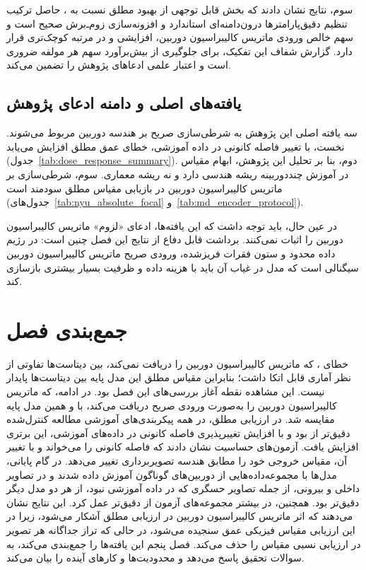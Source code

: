 سوم، نتایج نشان دادند که بخش قابل توجهی از بهبود مطلق
نسبت به \publishedbasemodel{}،
حاصل ترکیب تنظیم دقیق‌پارامترها درون‌دامنه‌ای استاندارد
و افزونه‌سازی زوم‌ـ‌برش صحیح است
و سهم خالص ورودی ماتریس کالیبراسیون دوربین، افزایشی و در مرتبه کوچک‌تری قرار دارد.
گزارش شفاف این تفکیک،
برای جلوگیری از بیش‌برآورد سهم هر مولفه ضروری است
و اعتبار علمی ادعاهای پژوهش را تضمین می‌کند.

\subsection[یافته‌های اصلی و دامنه ادعای پژوهش]{یافته‌های اصلی و دامنه ادعای پژوهش}
\label{subsec:literature_comparison}

سه یافته اصلی این پژوهش به
شرطی‌سازی صریح بر هندسه دوربین مربوط می‌شوند. نخست، با تغییر فاصله کانونی در داده آموزشی، خطای عمق مطلق \controlmodel{} افزایش می‌یابد (جدول~\ref{tab:dose_response_summary}). دوم، بنا بر تحلیل این پژوهش، ابهام مقیاس در آموزش
چنددوربینه ریشه هندسی دارد و نه ریشه معماری.
سوم، شرطی‌سازی بر ماتریس کالیبراسیون دوربین در بازیابی مقیاس مطلق سودمند است (جدول‌های~\ref{tab:nyu_absolute_focal} و~\ref{tab:md_encoder_protocol}).

در عین حال، باید توجه داشت که این یافته‌ها، ادعای «لزوم» ماتریس کالیبراسیون دوربین را اثبات نمی‌کنند.
برداشت
قابل دفاع از نتایج این فصل چنین است: در رژیم داده محدود و ستون فقرات فریزشده، ورودی صریح ماتریس کالیبراسیون دوربین سیگنالی است که
مدل در غیاب آن باید با هزینه داده و ظرفیت بسیار بیشتری بازسازی کند.

\section{جمع‌بندی فصل}
\label{sec:results_summary}

خطای \publishedbasemodel{}، که ماتریس کالیبراسیون دوربین را دریافت نمی‌کند، بین دیتاست‌ها تفاوتی از نظر آماری قابل اتکا داشت؛ بنابراین مقیاس مطلق این مدل پایه بین دیتاست‌ها پایدار نیست. این مشاهده نقطه آغاز بررسی‌های این فصل بود. در ادامه، \proposedmodel{} که ماتریس کالیبراسیون دوربین را به‌صورت ورودی صریح دریافت می‌کند، با \controlmodel{} و همین مدل پایه مقایسه شد. در ارزیابی مطلق، \proposedmodel{} در همه پیکربندی‌های آموزشی مطالعه کنترل‌شده دقیق‌تر از \controlmodel{} بود و با افزایش تغییرپذیری فاصله کانونی در داده‌های آموزشی، این برتری افزایش یافت. آزمون‌های حساسیت نشان دادند که \proposedmodel{} فاصله کانونی را می‌خواند و با تغییر آن، مقیاس خروجی خود را مطابق هندسه تصویربرداری تغییر می‌دهد. در گام پایانی، مدل‌ها با مجموعه‌داده‌هایی از دوربین‌های گوناگون آموزش داده شدند و \proposedmodel{} در تصاویر داخلی و بیرونی، از جمله تصاویر حسگری که در داده آموزشی نبود، از هر دو مدل دیگر دقیق‌تر بود. همچنین، \proposedmodel{} در بیشتر مجموعه‌های آزمون از \controlmodel{} دقیق‌تر عمل کرد. این نتایج نشان می‌دهند که اثر ماتریس کالیبراسیون دوربین در ارزیابی مطلق آشکار می‌شود، زیرا در این ارزیابی مقیاس فیزیکی عمق سنجیده می‌شود، در حالی که تراز جداگانه هر تصویر در ارزیابی نسبی مقیاس را حذف می‌کند. فصل پنجم این یافته‌ها را جمع‌بندی می‌کند، به سوالات تحقیق پاسخ می‌دهد و محدودیت‌ها و کارهای آینده را بیان می‌کند.
